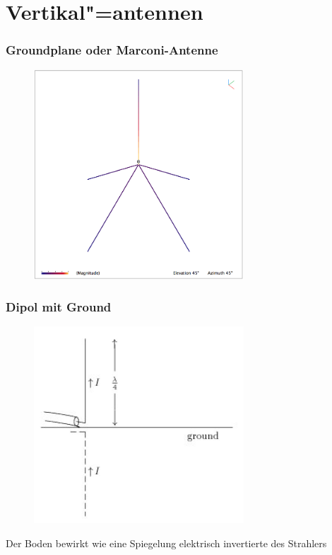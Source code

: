 \section*{Vertikal"=antennen}

\begin{frame}
  \frametitle{Groundplane oder Marconi-Antenne}
  \begin{center}
    \begin{figure}
      \includegraphics[width=0.7\textwidth,height=.75\textheight,keepaspectratio]{a09/GP-DB4UM.png}
    \end{figure}
  \end{center}
\end{frame}

\begin{frame}
  \frametitle{Dipol mit Ground}
  \begin{center}
    \begin{figure}
      \includegraphics[width=0.7\textwidth,height=.75\textheight,keepaspectratio]{a09/A6-3EN.jpg}
    \end{figure}
    Der Boden bewirkt wie eine Spiegelung elektrisch invertierte des Strahlers
  \end{center}
\end{frame}

